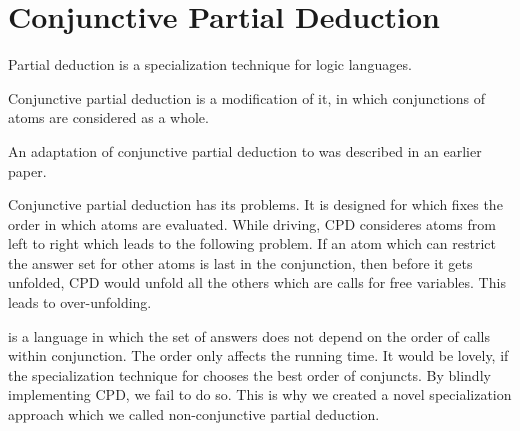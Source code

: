 \section{Conjunctive Partial Deduction}

Partial deduction is a specialization technique for logic languages.

Conjunctive partial deduction is a modification of it, in which conjunctions of atoms are considered as a whole.

An adaptation of conjunctive partial deduction to \mk{} was described in an earlier paper.


Conjunctive partial deduction has its problems.
It is designed for \pro{} which fixes the order in which atoms are evaluated.
While driving, CPD consideres atoms from left to right which leads to the following problem.
If an atom which can restrict the answer set for other atoms is last in the conjunction, then before it gets unfolded, CPD would unfold all the others which are calls for free variables.
This leads to over-unfolding.

\mk{} is a language in which the set of answers does not depend on the order of calls within conjunction.
The order only affects the running time.
It would be lovely, if the specialization technique for \mk{} chooses the best order of conjuncts.
By blindly implementing CPD, we fail to do so.
This is why we created a novel specialization approach which we called non-conjunctive partial deduction.